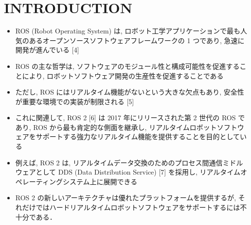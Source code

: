 
\section{INTRODUCTION}
\label{sec: introduction}

\begin{frame}{}
    \begin{itemize}
        \item ROS (Robot Operating System) は, ロボット工学アプリケーションで最も人気のあるオープンソースソフトウェアフレームワークの 1 つであり, 急速に開発が進んでいる [4]
        \item ROS の主な哲学は, ソフトウェアのモジュール性と構成可能性を促進することにより, ロボットソフトウェア開発の生産性を促進することである
        \item ただし, ROS にはリアルタイム機能がないという大きな欠点もあり, 安全性が重要な環境での実装が制限される [5]
        \item これに関連して, ROS 2 [6] は 2017 年にリリースされた第 2 世代の ROS であり, ROS から最も肯定的な側面を継承し, リアルタイムロボットソフトウェアをサポートする強力なリアルタイム機能を提供することを目的としている
        \item 例えば, ROS 2 は, リアルタイムデータ交換のためのプロセス間通信ミドルウェアとして DDS (Data Distribution Service) [7] を採用し, リアルタイムオペレーティングシステム上に展開できる
        \item ROS 2 の新しいアーキテクチャは優れたプラットフォームを提供するが, それだけではハードリアルタイムロボットソフトウェアをサポートするには不十分である．
    \end{itemize}
\end{frame}

